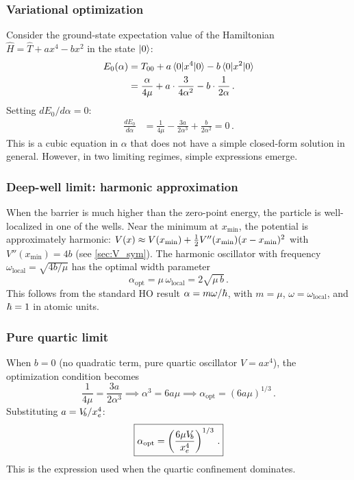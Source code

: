 \subsubsection{Variational optimization}

Consider the ground-state expectation value of the Hamiltonian $\hat{H} = \hat{T} + ax^4 - bx^2$
in the state $\ket{0}$:
\begin{align}
  E_0(\alpha) &= T_{00} + a\mel{0}{x^4}{0} - b\mel{0}{x^2}{0}\notag\\
  &= \frac{\alpha}{4\mu} + a\cdot\frac{3}{4\alpha^2} - b\cdot\frac{1}{2\alpha}\,.
\end{align}
Setting $dE_0/d\alpha = 0$:
\begin{align}
  \frac{dE_0}{d\alpha} &= \frac{1}{4\mu} - \frac{3a}{2\alpha^3} + \frac{b}{2\alpha^2} = 0\,.
\end{align}
This is a cubic equation in $\alpha$ that does not have a simple closed-form solution
in general. However, in two limiting regimes, simple expressions emerge.

\subsubsection{Deep-well limit: harmonic approximation}

When the barrier is much higher than the zero-point energy, the particle is well-localized
in one of the wells. Near the minimum at $x_{\min}$, the potential is approximately
harmonic: $V(x) \approx V(x_{\min}) + \tfrac{1}{2} V''(x_{\min})(x-x_{\min})^2$ with
$V''(x_{\min}) = 4b$ (see \cref{sec:V_sym}). The harmonic oscillator with frequency
$\omega_{\text{local}} = \sqrt{4b/\mu}$ has the optimal width parameter
\begin{equation}\label{eq:alpha_local_opt}
  \boxed{\alpha_{\text{opt}} = \mu\,\omega_{\text{local}} = 2\sqrt{\mu\,b}\,.}
\end{equation}
This follows from the standard HO result $\alpha = m\omega/\hbar$, with $m = \mu$,
$\omega = \omega_{\text{local}}$, and $\hbar = 1$ in atomic units.

\subsubsection{Pure quartic limit}

When $b = 0$ (no quadratic term, pure quartic oscillator $V = ax^4$), the optimization
condition becomes
\begin{equation}
  \frac{1}{4\mu} = \frac{3a}{2\alpha^3}
  \implies \alpha^3 = 6a\mu
  \implies \alpha_{\text{opt}} = (6a\mu)^{1/3}\,.
\end{equation}
Substituting $a = V_{\!b}/x_e^4$:
\begin{equation}\label{eq:alpha_quartic}
  \boxed{\alpha_{\text{opt}} = \left(\frac{6\mu V_{\!b}}{x_e^4}\right)^{1/3}\,.}
\end{equation}
This is the expression used when the quartic confinement dominates.

